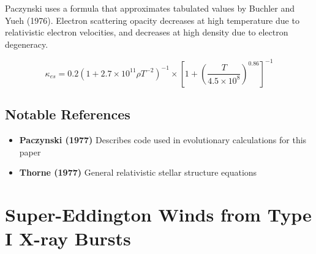 \documentclass[onecolumn]{aastex63}
\begin{document}
Paczynski uses a formula that approximates tabulated values by Buchler and Yueh (1976). Electron scattering opacity decreases at high temperature due to relativistic electron velocities, and decreases at high density due to electron degeneracy. 

\begin{equation}
    \kappa_{es} = 0.2\left(1 + 2.7 \times 10^{11}\rho T^{-2}\right)^{-1} \times \left[1 + \left(\frac{T}{4.5\times10^8}\right)^{0.86}\right]^{-1}
\end{equation}


\subsection{Notable References}
\begin{itemize}
    \item \textbf{Paczynski (1977)} Describes code used in evolutionary calculations for this paper
    \item \textbf{Thorne (1977)} General relativistic stellar structure equations
\end{itemize}


\section{Super-Eddington Winds from Type I X-ray Bursts}
\begin{centering}

\cite{yu2018}

\end{centering}
\end{document}
